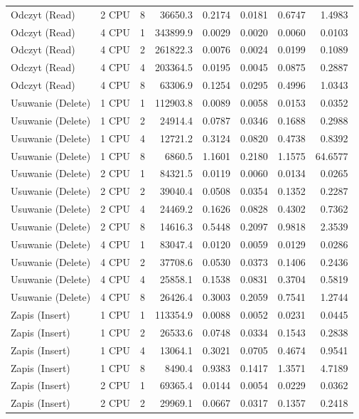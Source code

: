 \begin{table}[ht]
{\begin{tabular}{llcrrrrr}
Odczyt (Read) & 2 CPU & 8 & 36650.3 & 0.2174 & 0.0181 & 0.6747 & 1.4983 \\
Odczyt (Read) & 4 CPU & 1 & 343899.9 & 0.0029 & 0.0020 & 0.0060 & 0.0103 \\
Odczyt (Read) & 4 CPU & 2 & 261822.3 & 0.0076 & 0.0024 & 0.0199 & 0.1089 \\
Odczyt (Read) & 4 CPU & 4 & 203364.5 & 0.0195 & 0.0045 & 0.0875 & 0.2887 \\
Odczyt (Read) & 4 CPU & 8 & 63306.9 & 0.1254 & 0.0295 & 0.4996 & 1.0343 \\
Usuwanie (Delete) & 1 CPU & 1 & 112903.8 & 0.0089 & 0.0058 & 0.0153 & 0.0352 \\
Usuwanie (Delete) & 1 CPU & 2 & 24914.4 & 0.0787 & 0.0346 & 0.1688 & 0.2988 \\
Usuwanie (Delete) & 1 CPU & 4 & 12721.2 & 0.3124 & 0.0820 & 0.4738 & 0.8392 \\
Usuwanie (Delete) & 1 CPU & 8 & 6860.5 & 1.1601 & 0.2180 & 1.1575 & 64.6577 \\
Usuwanie (Delete) & 2 CPU & 1 & 84321.5 & 0.0119 & 0.0060 & 0.0134 & 0.0265 \\
Usuwanie (Delete) & 2 CPU & 2 & 39040.4 & 0.0508 & 0.0354 & 0.1352 & 0.2287 \\
Usuwanie (Delete) & 2 CPU & 4 & 24469.2 & 0.1626 & 0.0828 & 0.4302 & 0.7362 \\
Usuwanie (Delete) & 2 CPU & 8 & 14616.3 & 0.5448 & 0.2097 & 0.9818 & 2.3539 \\
Usuwanie (Delete) & 4 CPU & 1 & 83047.4 & 0.0120 & 0.0059 & 0.0129 & 0.0286 \\
Usuwanie (Delete) & 4 CPU & 2 & 37708.6 & 0.0530 & 0.0373 & 0.1406 & 0.2436 \\
Usuwanie (Delete) & 4 CPU & 4 & 25858.1 & 0.1538 & 0.0831 & 0.3704 & 0.5819 \\
Usuwanie (Delete) & 4 CPU & 8 & 26426.4 & 0.3003 & 0.2059 & 0.7541 & 1.2744 \\
Zapis (Insert) & 1 CPU & 1 & 113354.9 & 0.0088 & 0.0052 & 0.0231 & 0.0445 \\
Zapis (Insert) & 1 CPU & 2 & 26533.6 & 0.0748 & 0.0334 & 0.1543 & 0.2838 \\
Zapis (Insert) & 1 CPU & 4 & 13064.1 & 0.3021 & 0.0705 & 0.4674 & 0.9541 \\
Zapis (Insert) & 1 CPU & 8 & 8490.4 & 0.9383 & 0.1417 & 1.3571 & 4.7189 \\
Zapis (Insert) & 2 CPU & 1 & 69365.4 & 0.0144 & 0.0054 & 0.0229 & 0.0362 \\
Zapis (Insert) & 2 CPU & 2 & 29969.1 & 0.0667 & 0.0317 & 0.1357 & 0.2418 \\

\end{tabular}}
\end{table}

